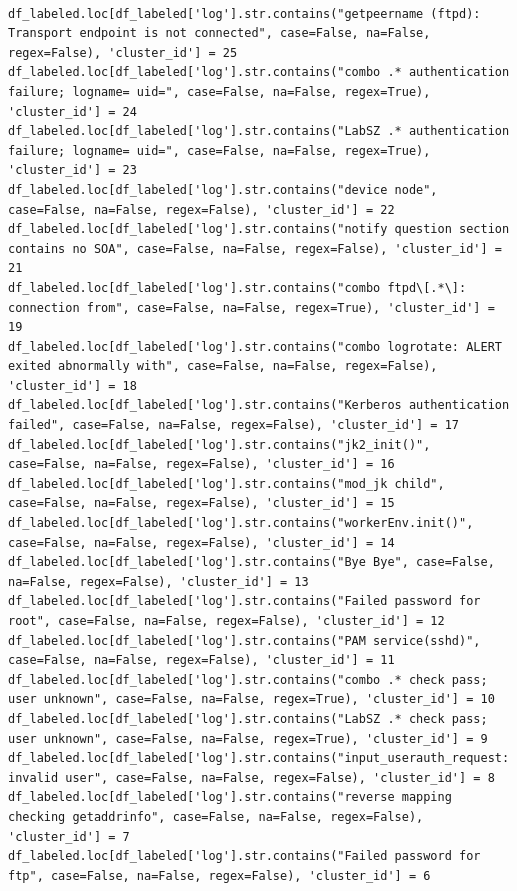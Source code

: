 \begin{lstlisting}[caption={Label der Groud-Truth Klassen}, label={lst:gt-labeling}]

df_labeled.loc[df_labeled['log'].str.contains("getpeername (ftpd): Transport endpoint is not connected", case=False, na=False, regex=False), 'cluster_id'] = 25
df_labeled.loc[df_labeled['log'].str.contains("combo .* authentication failure; logname= uid=", case=False, na=False, regex=True), 'cluster_id'] = 24
df_labeled.loc[df_labeled['log'].str.contains("LabSZ .* authentication failure; logname= uid=", case=False, na=False, regex=True), 'cluster_id'] = 23
df_labeled.loc[df_labeled['log'].str.contains("device node", case=False, na=False, regex=False), 'cluster_id'] = 22
df_labeled.loc[df_labeled['log'].str.contains("notify question section contains no SOA", case=False, na=False, regex=False), 'cluster_id'] = 21
df_labeled.loc[df_labeled['log'].str.contains("combo ftpd\[.*\]: connection from", case=False, na=False, regex=True), 'cluster_id'] = 19
df_labeled.loc[df_labeled['log'].str.contains("combo logrotate: ALERT exited abnormally with", case=False, na=False, regex=False), 'cluster_id'] = 18
df_labeled.loc[df_labeled['log'].str.contains("Kerberos authentication failed", case=False, na=False, regex=False), 'cluster_id'] = 17
df_labeled.loc[df_labeled['log'].str.contains("jk2_init()", case=False, na=False, regex=False), 'cluster_id'] = 16
df_labeled.loc[df_labeled['log'].str.contains("mod_jk child", case=False, na=False, regex=False), 'cluster_id'] = 15
df_labeled.loc[df_labeled['log'].str.contains("workerEnv.init()", case=False, na=False, regex=False), 'cluster_id'] = 14
df_labeled.loc[df_labeled['log'].str.contains("Bye Bye", case=False, na=False, regex=False), 'cluster_id'] = 13
df_labeled.loc[df_labeled['log'].str.contains("Failed password for root", case=False, na=False, regex=False), 'cluster_id'] = 12
df_labeled.loc[df_labeled['log'].str.contains("PAM service(sshd)", case=False, na=False, regex=False), 'cluster_id'] = 11
df_labeled.loc[df_labeled['log'].str.contains("combo .* check pass; user unknown", case=False, na=False, regex=True), 'cluster_id'] = 10
df_labeled.loc[df_labeled['log'].str.contains("LabSZ .* check pass; user unknown", case=False, na=False, regex=True), 'cluster_id'] = 9
df_labeled.loc[df_labeled['log'].str.contains("input_userauth_request: invalid user", case=False, na=False, regex=False), 'cluster_id'] = 8
df_labeled.loc[df_labeled['log'].str.contains("reverse mapping checking getaddrinfo", case=False, na=False, regex=False), 'cluster_id'] = 7
df_labeled.loc[df_labeled['log'].str.contains("Failed password for ftp", case=False, na=False, regex=False), 'cluster_id'] = 6

\end{lstlisting}

